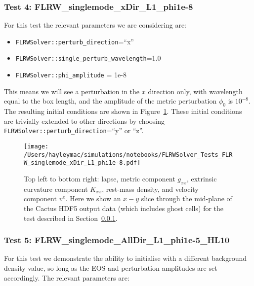 \subsubsection{Test 4: FLRW\_singlemode\_xDir\_L1\_phi1e-8} \label{sec:test4}

For this test the relevant parameters we are considering are:

\begin{itemize}
	\item \texttt{FLRWSolver::perturb\_direction}=``x''
	\item \texttt{FLRWSolver::single\_perturb\_wavelength}=1.0
	\item \texttt{FLRWSolver::phi\_amplitude} = 1e-8
\end{itemize}
This means we will see a perturbation in the $x$ direction only, with wavelength equal to the box length, and the amplitude of the metric perturbation $\phi_0$ is $10^{-8}$. The resulting initial conditions are shown in Figure~\ref{fig:test4}. These initial conditions are trivially extended to other directions by choosing \texttt{FLRWSolver::perturb\_direction}=``y'' or ``z''. 

\begin{figure}[ht]
	\begin{center}
	   \texttt{[image: /Users/hayleymac/simulations/notebooks/FLRWSolver\_Tests\_FLRW\_singlemode\_xDir\_L1\_phi1e-8.pdf]}
	\end{center}
	\caption{Top left to bottom right: lapse, metric component $g_{xx}$, extrinsic curvature component $K_{xx}$, rest-mass density, and velocity component $v^x$. Here we show an $x-y$ slice through the mid-plane of the Cactus HDF5 output data (which includes ghost cells) for the test described in Section~\ref{sec:test4}.}
	\label{fig:test4}
\end{figure}



\subsubsection{Test 5: FLRW\_singlemode\_AllDir\_L1\_phi1e-5\_HL10} \label{sec:test5}

For this test we demonstrate the ability to initialise with a different background density value, so long as the EOS and perturbation amplitudes are set accordingly. The relevant parameters are:

